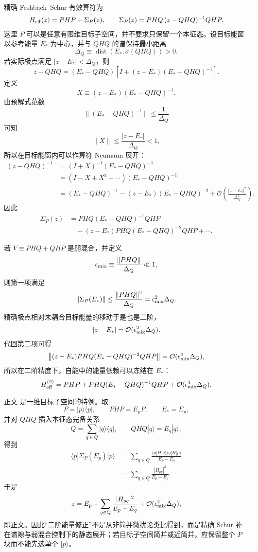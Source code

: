 \begin{derivation}

精确 Feshbach--Schur 有效算符为
\[
H_{\rm eff}(z)
=
PHP+\Sigma_P(z),
\qquad
\Sigma_P(z)
=
PHQ\,(z-QHQ)^{-1}QHP.
\]
这里 \(P\) 可以是任意有限维目标子空间，并不要求只保留一个本征态。设目标能窗以参考能量 \(E_*\) 为中心，并与 \(QHQ\) 的谱保持最小距离
\[
\Delta_Q
\equiv
\operatorname{dist}\!\left(E_*,\sigma(QHQ)\right)>0.
\]
若实际极点满足 \(|z-E_*|<\Delta_Q\)，则
\[
z-QHQ
=
(E_*-QHQ)
\left[
I+(z-E_*)(E_*-QHQ)^{-1}
\right].
\]
定义
\[
X\equiv
(z-E_*)(E_*-QHQ)^{-1}.
\]
由预解式范数
\[
\|(E_*-QHQ)^{-1}\|
\le\frac1{\Delta_Q}
\]
可知
\[
\|X\|
\le\frac{|z-E_*|}{\Delta_Q}<1,
\]
所以在目标能窗内可以作算符 Neumann 展开：
\begin{align*}
(z-QHQ)^{-1}
&=
\left(I+X\right)^{-1}(E_*-QHQ)^{-1}\\
&=
\left(I-X+X^2-\cdots\right)
(E_*-QHQ)^{-1}\\
&=
(E_*-QHQ)^{-1}
-(z-E_*)(E_*-QHQ)^{-2}
+\mathcal O\!\left(
\frac{|z-E_*|^2}{\Delta_Q^3}
\right).
\end{align*}
因此
\begin{align*}
\Sigma_P(z)
&=
PHQ(E_*-QHQ)^{-1}QHP\\
&\quad
-(z-E_*)
PHQ(E_*-QHQ)^{-2}QHP
+\cdots .
\end{align*}

若 \(V\equiv PHQ+QHP\) 是弱混合，并定义
\[
\epsilon_{\rm mix}
\equiv
\frac{\|PHQ\|}{\Delta_Q}\ll1,
\]
则第一项满足
\[
\|\Sigma_P(E_*)\|
\le
\frac{\|PHQ\|^2}{\Delta_Q}
=
\epsilon_{\rm mix}^2\Delta_Q.
\]
精确极点相对未耦合目标能量的移动于是也是二阶，
\[
|z-E_*|
=
\mathcal O(\epsilon_{\rm mix}^2\Delta_Q).
\]
代回第二项可得
\[
\left\|
(z-E_*)
PHQ(E_*-QHQ)^{-2}QHP
\right\|
=
\mathcal O(\epsilon_{\rm mix}^4\Delta_Q),
\]
所以在二阶精度下，自能中的能量依赖可以冻结在 \(E_*\)：
\[
H_{\rm eff}^{(2)}
=
PHP
+
PHQ(E_*-QHQ)^{-1}QHP
+
\mathcal O(\epsilon_{\rm mix}^4\Delta_Q).
\]

正文 是一维目标子空间的特例。取
\[
P=|p\rangle\langle p|,
\qquad
PHP=E_pP,
\qquad
E_*=E_p,
\]
并对 \(QHQ\) 插入本征态完备关系
\[
Q
=
\sum_{q\in Q}|q\rangle\langle q|,
\qquad
QHQ|q\rangle=E_q|q\rangle,
\]
得到
\begin{align*}
\langle p|\Sigma_P(E_p)|p\rangle
&=
\sum_{q\in Q}
\frac{
\langle p|H|q\rangle
\langle q|H|p\rangle
}{E_p-E_q}\\
&=
\sum_{q\in Q}
\frac{|H_{pq}|^2}{E_p-E_q}.
\end{align*}
于是
\[
z
=
E_p
+
\sum_{q\in Q}
\frac{|H_{pq}|^2}{E_p-E_q}
+
\mathcal O(\epsilon_{\rm mix}^4\Delta_Q),
\]
即正文。因此“二阶能量修正”不是从非简并微扰论类比得到，而是精确 Schur 补在谱隙与弱混合控制下的静态展开；若目标子空间简并或近简并，应保留整个 \(P\) 块而不能先选单个 \(|p\rangle\)。
\end{derivation}
